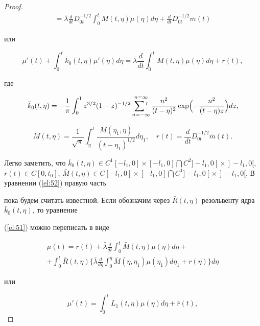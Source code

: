 \begin{proof}
\begin{multline*}
=\bar{\lambda}\frac{d}{dt}D_{0t}^{-1/2}\int_0^tM(t,\eta)\mu(\eta)d\eta+\frac{d}{dt}D_{0t}^{-1/2}\bar{m}(t)

\end{multline*}

или

\begin{equation} \label{el:52}

\mu'(t)+\int_0^t\bar{k}_0(t,\eta)\mu'(\eta)d\eta=\bar{\lambda}\frac{d}{dt}\int_0^t\bar{M}(t,\eta)\mu(\eta)d\eta+r(t),

\end{equation}

где

$$\bar{k}_0(t,\eta)=-\frac{1}{\pi}\int_0^1z^{3/2}(1-z)^{-1/2}\mathop{\sum\rule{0mm}{11pt}{'}}\limits_{n=-\infty}^{n=\infty}\frac{n^2}{(t-\eta)^2}

\exp\Bigl(-\frac{n^2}{(t-\eta)z}\Bigr)dz,$$

$$\bar{M}(t,\eta)=\frac{1}{\sqrt{\pi}}\int_{\eta}^{t}\frac{M(\eta_1,\eta)}{(t-\eta_1)^{1/2}}d\eta_1, \quad

r(t)=\frac{d}{dt}D_{0t}^{-1/2}\bar{m}(t).$$



Легко заметить, что $\bar{k}_0(t,\eta)\in C^1[-l_1, 0]\times[-l_1, 0]\bigcap C^2]-l_1, 0[{}\times{}]-l_1, 0[$, $r(t)\in

C[0,t_0]$, $\bar{M}(t,\eta)\in C[-l_1, 0]\times[-l_1, 0]\bigcap C^1]-l_1, 0[{}\times{}]-l_1, 0[$. В уравнении (\ref{el:52}) правую часть 

пока будем считать известной. Если обозначим через $\bar{R}(t,\eta)$ резольвенту ядра $\bar{k}_0(t,\eta)$, то уравнение 

(\ref{el:51}) можно переписать в виде

\begin{multline*}

\mu(t)=r(t)+\bar{\lambda}\frac{d}{dt}\int_0^t\bar{M}(t,\eta)\mu(\eta)d\eta+\\

+\int_0^t\bar{R}(t,\eta)\biggl\{\bar{\lambda}\frac{d}{d\eta}\int_0^{\eta}\bar{M}(\eta,\eta_1)\mu(\eta_1)d\eta_1+r(\eta)\biggr\}d\eta

\end{multline*}

или

\begin{equation} \label{el:53}

\mu'(t)=\int_0^tL_1(t,\eta)\mu(\eta)d\eta+\bar{r}(t),


\end{equation}
\end{proof}
